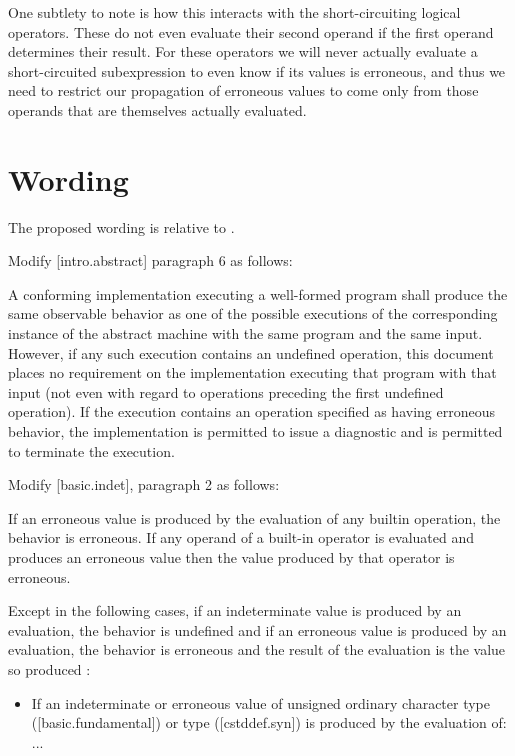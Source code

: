 One subtlety to note is how this interacts with the short-circuiting logical operators.  These do not even evaluate their second operand if the first operand determines their result.  For these operators we will never actually evaluate a short-circuited subexpression to even know if its values is erroneous, and thus we need to restrict our propagation of erroneous values to come only from those operands that are themselves actually evaluated.

\section{Wording}

The proposed wording is relative to \cite{N5014}. 

Modify [intro.abstract] paragraph 6 as follows:

\begin{adjustwidth}{0.5cm}{0.5cm}
A conforming implementation executing a well-formed program shall produce the same observable behavior as one of the possible executions of the corresponding instance of the abstract machine with the same program and the same input. However, if any such execution contains an undefined operation, this document places no requirement on the implementation executing that program with that input (not even with regard to operations preceding the first undefined operation). If the execution contains an operation specified as having erroneous behavior, the implementation is permitted to issue a diagnostic and is permitted to terminate the execution.
\end{adjustwidth}


Modify [basic.indet], paragraph 2 as follows:

\begin{adjustwidth}{0.5cm}{0.5cm}
\begin{addedblock}
If an erroneous value is produced by the evaluation of any builtin operation, the behavior is erroneous.
If any operand of a built-in operator is evaluated and produces an erroneous value then the value
produced by that operator is erroneous.
\end{addedblock}

Except in the following cases, if an indeterminate value is produced by an evaluation,
the behavior is undefined  and if an erroneous value is produced by an evaluation, the behavior is erroneous and
the result of the evaluation is the value so produced 
:
\begin{itemize}
\item If an indeterminate or erroneous value of unsigned ordinary character type ([basic.\allowbreak{}fundamental]) or  type ([cstddef.syn]) is produced by the evaluation of:  \\ ...
\end{itemize}
\end{adjustwidth}


